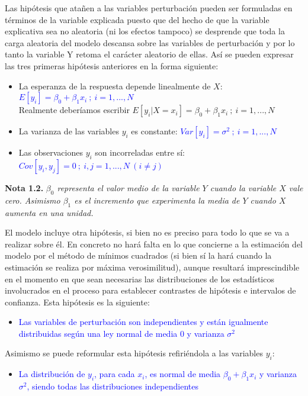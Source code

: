 \documentclass[10pt,a4paper]{book}
\begin{document}
Las hipótesis que atañen a las variables perturbación pueden ser formuladas en términos de la variable explicada puesto que del hecho de que la variable explicativa sea no aleatoria (ni los efectos tampoco) se desprende que toda la carga aleatoria del modelo descansa sobre las variables de perturbación y por lo tanto la variable Y retoma el carácter aleatorio de ellas. Así se pueden expresar las tres primeras hipótesis anteriores en la forma siguiente:
\begin{itemize}
\item La esperanza de la respuesta depende linealmente de $X$: \textcolor{blue}{$E[y_i]=\beta_0 + \beta_1x_i\ ;\ i=1,...,N$}\\
{\scriptsize Realmente deberíamos escribir $E[y_i | X=x_i]=\beta_0 + \beta_1x_i\ ;\ i=1,...,N$}
\item La varianza de las variables $y_i$ es constante: \textcolor{blue}{$Var[y_i]=\sigma^2\ ;\ i=1,...,N$}
\item Las observaciones $y_i$ son incorreladas entre sí: \textcolor{blue}{$Cov[y_i,y_j]=0\ ;\ i,j=1,...,N\ (i \neq j)$}
\end{itemize}

\textbf{Nota 1.2.} \textit{$\beta_0$ representa el valor medio de la variable $Y$ cuando la variable $X$ vale cero. Asimismo $\beta_1$ es el incremento que experimenta la media de $Y$ cuando $X$ aumenta en una unidad.}

El modelo incluye otra hipótesis, si bien no es preciso para todo lo que se va a realizar sobre él. En concreto no hará falta en lo que concierne a la estimación del modelo por el método de mínimos cuadrados (si bien sí la hará cuando la estimación se realiza por máxima verosimilitud), aunque resultará imprescindible en el momento en que sean necesarias las distribuciones de los estadísticos involucrados en el proceso para establecer contrastes de hipótesis e intervalos de confianza. Esta hipótesis es la siguiente:
\begin{itemize}
\item \textcolor{blue}{Las variables de perturbación son independientes y están igualmente distribuidas según una ley normal de media 0 y varianza $\sigma^2$}
\end{itemize}

Asimismo se puede reformular esta hipótesis refiriéndola a las variables $y_i$:
\begin{itemize}
\item \textcolor{blue}{La distribución de $y_i$, para cada $x_i$, es normal de media $\beta_0 + \beta_1x_i$ y varianza $\sigma^2$, siendo todas las distribuciones independientes}
\end{itemize}
\end{document}
